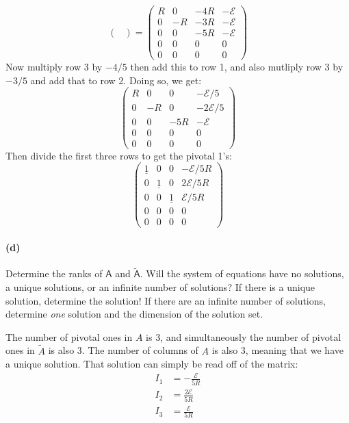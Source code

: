 \documentclass{article}
\begin{document}
\begin{solution}
\[\begin{pmatrix}
			\end{pmatrix} = \begin{pmatrix} R&0&-4R&-\mathcal E\\0&-R&-3R&-\mathcal E\\0&0&-5R&-\mathcal E \\0&0&0&0\\0&0&0&0
	\end{pmatrix} 
	\] 
	Now multiply row 3 by $-4 / 5$ then add this to row 1, and also mutliply row 3 by $-3 / 5$ and add that 
	to row 2. Doing so, we get: 
	\[
		\begin{pmatrix} R &0&0&-\mathcal E/ 5\\0 &-R&0&-2\mathcal E / 5\\ 0&0&-5R & - \mathcal E\\0&0&0&0\\0&0&0&0\end{pmatrix} 
	\] 
	Then divide the first three rows to get the pivotal 1's: 
	\[
		\begin{pmatrix} \underline 1 &0&0&-\mathcal E / 5R\\0 & \underline 1 & 0 & 2\mathcal E / 5R\\ 
		0 &0 & \underline 1 & \mathcal E / 5R\\0&0&0&0\\0&0&0&0 \end{pmatrix} 
	\] 


\end{solution}


\paragraph{(d)}
Determine the ranks of $\mathsf{A}$ and $\tilde{\mathsf{A}}$.  Will the system of equations have no solutions, a unique solutions, or an infinite number of solutions?
If there is a unique solution, determine the solution!  If there are an infinite number of solutions, determine \emph{one} solution and the dimension of the solution set.

\begin{solution}
	The number of pivotal ones in $A$ is 3, and simultaneously the number of pivotal ones in $\tilde A$ is also
	3. The number of columns of $A$ is also 3, meaning that we have a unique solution. That solution can 
	simply be read off of the matrix: 
	\begin{align*}
		I_1 &= -\frac{\mathcal E}{5R}\\
		I_2 &= \frac{2\mathcal E}{5R} \\
		I_3 &= \frac{\mathcal E}{5R}
	\end{align*}
\end{solution}
\end{document}
